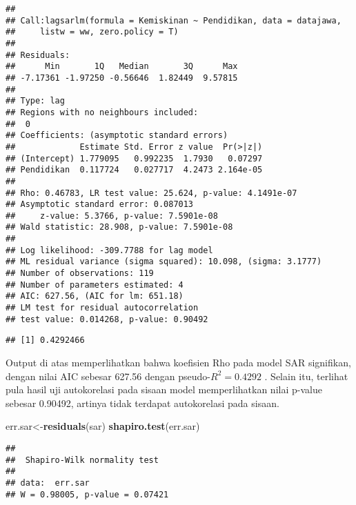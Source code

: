 \documentclass[
]{book}
\newenvironment{Shaded}{\begin{snugshade}}{\end{snugshade}}
\newcommand{\DecValTok}[1]{\textcolor[rgb]{0.00,0.00,0.81}{#1}}
\newcommand{\KeywordTok}[1]{\textcolor[rgb]{0.13,0.29,0.53}{\textbf{#1}}}
\newcommand{\NormalTok}[1]{#1}
\newcommand{\OperatorTok}[1]{\textcolor[rgb]{0.81,0.36,0.00}{\textbf{#1}}}
\begin{document}
\begin{verbatim}
## 
## Call:lagsarlm(formula = Kemiskinan ~ Pendidikan, data = datajawa, 
##     listw = ww, zero.policy = T)
## 
## Residuals:
##      Min       1Q   Median       3Q      Max 
## -7.17361 -1.97250 -0.56646  1.82449  9.57815 
## 
## Type: lag 
## Regions with no neighbours included:
##  0 
## Coefficients: (asymptotic standard errors) 
##             Estimate Std. Error z value  Pr(>|z|)
## (Intercept) 1.779095   0.992235  1.7930   0.07297
## Pendidikan  0.117724   0.027717  4.2473 2.164e-05
## 
## Rho: 0.46783, LR test value: 25.624, p-value: 4.1491e-07
## Asymptotic standard error: 0.087013
##     z-value: 5.3766, p-value: 7.5901e-08
## Wald statistic: 28.908, p-value: 7.5901e-08
## 
## Log likelihood: -309.7788 for lag model
## ML residual variance (sigma squared): 10.098, (sigma: 3.1777)
## Number of observations: 119 
## Number of parameters estimated: 4 
## AIC: 627.56, (AIC for lm: 651.18)
## LM test for residual autocorrelation
## test value: 0.014268, p-value: 0.90492
\end{verbatim}

\begin{Shaded}
\end{Shaded}

\begin{verbatim}
## [1] 0.4292466
\end{verbatim}

Output di atas memperlihatkan bahwa koefisien Rho pada model SAR signifikan, dengan nilai AIC sebesar 627.56 dengan pseudo-\(R^2=0.4292\) . Selain itu, terlihat pula hasil uji autokorelasi pada sisaan model memperlihatkan nilai p-value sebesar 0.90492, artinya tidak terdapat autokorelasi pada sisaan.

\begin{Shaded}
\begin{Highlighting}[]
\NormalTok{err.sar\textless{}{-}}\KeywordTok{residuals}\NormalTok{(sar)}
\KeywordTok{shapiro.test}\NormalTok{(err.sar)}
\end{Highlighting}
\end{Shaded}

\begin{verbatim}
## 
##  Shapiro-Wilk normality test
## 
## data:  err.sar
## W = 0.98005, p-value = 0.07421
\end{verbatim}
\end{document}
